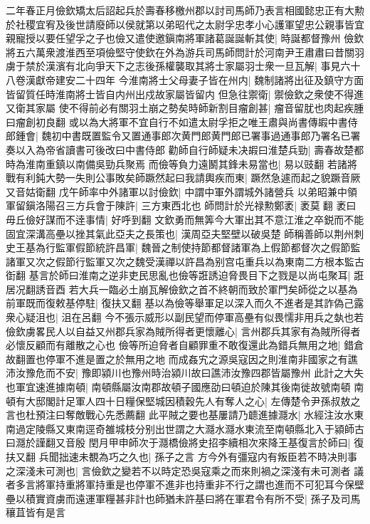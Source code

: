 二年春正月儉欽矯太后詔起兵於壽春移檄州郡以討司馬師乃表言相國懿忠正有大勲於社稷宜宥及後世請廢師以侯就第以弟昭代之太尉孚忠孝小心護軍望忠公親事皆宜親寵授以要任望孚之子也儉又遣使邀鎭南將軍諸葛誕誕斬其使|{
	時誕都督豫州}
儉欽將五六萬衆渡淮西至項儉堅守使欽在外為游兵司馬師問計於河南尹王肅肅曰昔關羽虜于禁於漢濱有北向爭天下之志後孫權襲取其將士家屬羽士衆一旦瓦解|{
	事見六十八卷漢獻帝建安二十四年}
今淮南將士父母妻子皆在州内|{
	魏制諸將出征及鎮守方面皆留質任時淮南將士皆自内州出戍故家屬皆留内}
但急往禦衛|{
	禦儉欽之衆使不得進又衛其家屬}
使不得前必有關羽土崩之勢矣時師新割目瘤創甚|{
	瘤音留肬也肉起疾腫曰瘤創初良翻}
或以為大將軍不宜自行不如遣太尉孚拒之唯王肅與尚書傳嘏中書侍郎鍾會|{
	魏初中書既置監令又置通事郎次黄門郎黄門郎已署事過通事郎乃署名已署奏以入為帝省讀書可後改曰中書侍郎}
勸師自行師疑未决嘏曰淮楚兵勁|{
	壽春故楚都時為淮南重鎮以南備吳勁兵聚焉}
而儉等負力遠鬭其鋒未易當也|{
	易以豉翻}
若諸將戰有利鈍大勢一失則公事敗矣師蹶然起曰我請輿疾而東|{
	蹶然急遽而起之貌蹶音厥又音姑衛翻}
戊午師率中外諸軍以討儉欽|{
	中謂中軍外謂城外諸營兵}
以弟昭兼中領軍留鎭洛陽召三方兵會于陳許|{
	三方東西北也}
師問計於光禄勲鄭袤|{
	袤莫翻}
袤曰毋丘儉好謀而不逹事情|{
	好呼到翻}
文欽勇而無筭今大軍出其不意江淮之卒鋭而不能固宜深溝高壘以挫其氣此亞夫之長策也|{
	漢周亞夫堅壁以破吳楚}
師稱善師以荆州刺史王基為行監軍假節統許昌軍|{
	魏晉之制使持節都督諸軍為上假節都督次之假節監諸軍又次之假節行監軍又次之魏受漢禪以許昌為别宫屯重兵以為東南二方根本監古衘翻}
基言於師曰淮南之逆非吏民思亂也儉等誑誘迫脅畏目下之戮是以尚屯聚耳|{
	誑居况翻誘音酉}
若大兵一臨必土崩瓦解儉欽之首不終朝而致於軍門矣師從之以基為前軍既而復敕基停駐|{
	復扶又翻}
基以為儉等舉軍足以深入而久不進者是其詐偽己露衆心疑沮也|{
	沮在呂翻}
今不張示威形以副民望而停軍高壘有似畏懦非用兵之埶也若儉欽虜畧民人以自益又州郡兵家為賊所得者更懷離心|{
	言州郡兵其家有為賊所得者必懷反顧而有離散之心也}
儉等所迫脅者自顧罪重不敢復還此為錯兵無用之地|{
	錯倉故翻置也停軍不進是置之於無用之地}
而成姦宄之源吳寇因之則淮南非國家之有譙沛汝豫危而不安|{
	豫即潁川也豫州時治潁川故曰譙沛汝豫四郡皆屬豫州}
此計之大失也軍宜速進據南頓|{
	南頓縣屬汝南郡故頓子國應劭曰頓迫於陳其後南徙故號南頓}
南頓有大邸閣計足軍人四十日糧保堅城因積穀先人有奪人之心|{
	左傳楚令尹孫叔敖之言也杜預注曰奪敵戰心先悉薦翻}
此平賊之要也基屢請乃聼進據㶏水|{
	水經注汝水東南過定陵縣又東南逕奇雒城枝分别出世謂之大㶏水㶏水東流至南頓縣北入于潁師古曰㶏於謹翻又音殷}
閏月甲申師次于㶏橋儉將史招李續相次來降王基復言於師曰|{
	復扶又翻}
兵聞拙速未覩為巧之久也|{
	孫子之言}
方今外有彊寇内有叛臣若不時决則事之深淺未可測也|{
	言儉欽之變若不以時定恐吳寇乘之而來則禍之深淺有未可測者}
議者多言將軍持重將軍持重是也停軍不進非也持重非不行之謂也進而不可犯耳今保壁壘以積實資虜而遠運軍糧甚非計也師猶未許基曰將在軍君令有所不受|{
	孫子及司馬穰苴皆有是言}
